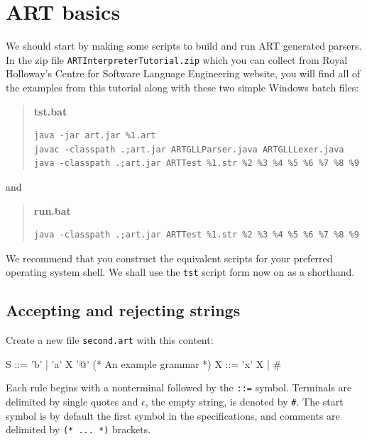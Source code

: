 \chapter{ART basics}
We should start by making some scripts to build and run ART generated parsers. In the zip file {\tt ARTInterpreterTutorial.zip} which you can collect from Royal Holloway's Centre for Software Language Engineering website, you will find all of the examples from this tutorial along with these two simple Windows batch files:

\begin{quote}
{\sf\bfseries tst.bat}

\begin{verbatim}
java -jar art.jar %1.art 
javac -classpath .;art.jar ARTGLLParser.java ARTGLLLexer.java
java -classpath .;art.jar ARTTest %1.str %2 %3 %4 %5 %6 %7 %8 %9
\end{verbatim}
\end{quote}
and 
\begin{quote}
{\sf\bfseries run.bat}

\begin{verbatim}
java -classpath .;art.jar ARTTest %1.str %2 %3 %4 %5 %6 %7 %8 %9
\end{verbatim}
\end{quote}
We recommend that you construct the equivalent scripts for your preferred operating system shell. We shall use the {\tt tst} script form now on as a shorthand.

\section{Accepting and rejecting strings}
Create a new file {\tt second.art} with this content:
\begin{codeblock}
S ::= 'b' | 'a' X '@' (* An example grammar *)
X ::= 'x' X | # 
\end{codeblock}
Each rule begins with a nonterminal
followed by the \verb+::=+ symbol. Terminals are delimited by single quotes and $\epsilon$, the empty string, is denoted by \verb+#+. The start symbol is by default the first symbol in the specifications, and comments are delimited by {\tt (* ... *)} brackets. 

